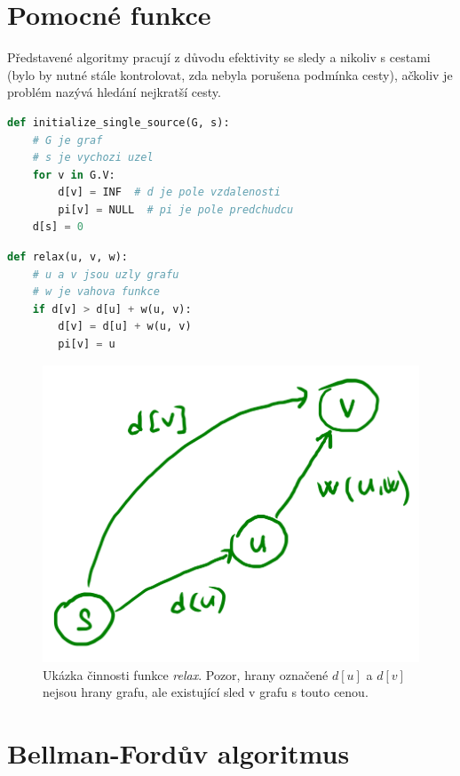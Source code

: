 \section{Pomocné funkce}

Představené algoritmy pracují z důvodu efektivity se sledy a nikoliv s cestami (bylo by nutné stále kontrolovat, zda nebyla porušena podmínka cesty), ačkoliv je problém nazývá hledání nejkratší cesty.

\bigskip\noindent\begin{minipage}{\linewidth}
\begin{lstlisting}[language=Python, caption={Pomocná inicializační funkce. Složitost je $\Theta(n)$, kde $n$ je počet uzlů.}]
def initialize_single_source(G, s):
    # G je graf
    # s je vychozi uzel
    for v in G.V:
        d[v] = INF  # d je pole vzdalenosti
        pi[v] = NULL  # pi je pole predchudcu
    d[s] = 0
\end{lstlisting}
\end{minipage}

\noindent\begin{minipage}{\linewidth}
\begin{lstlisting}[language=Python, caption={Pomocná funkce \textit{relax}. Složitost je $O(1)$.}]
def relax(u, v, w):
    # u a v jsou uzly grafu
    # w je vahova funkce
    if d[v] > d[u] + w(u, v):
        d[v] = d[u] + w(u, v)
        pi[v] = u
\end{lstlisting}
\end{minipage}

\begin{figure}[H]
    \centering
    \includegraphics[width=0.4\linewidth]{relax.png}
    \caption{Ukázka činnosti funkce \textit{relax}. Pozor, hrany označené $d[u]$ a $d[v]$ nejsou hrany grafu, ale existující sled v grafu s touto cenou.}
\end{figure}


\section{Bellman-Fordův algoritmus}

